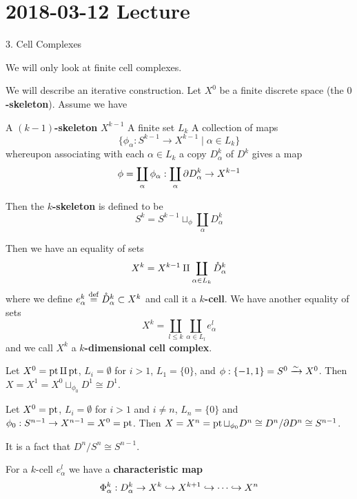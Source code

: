\section{2018-03-12 Lecture}

3. Cell Complexes

We will only look at finite cell complexes.

\begin{defn}
	\begin{enum}
		We will describe an iterative construction.
		\io Let $X^0$ be a finite discrete space (the \textbf{$0$-skeleton}).
		\io Assume we have
		\begin{itm}
			\io A \textbf{$(k-1)$-skeleton} $X^{k-1}$
			\io A finite set $L_k$
			\io A collection of maps
			\[\{\phi_\alpha: S^{k-1} \to X^{k-1} \mid \alpha \in L_k\}\]
			whereupon associating with each $\alpha \in L_k$ a copy $D_\alpha^k$ of $D^k$ gives a map
			\[\phi = \coprod_\alpha \phi_\alpha: \coprod_\alpha \partial D_\alpha^k \to X^{k-1}\]
		\end{itm}
		Then the \textbf{$k$-skeleton} is defined to be
		\[S^k = S^{k-1} \sqcup_\phi \coprod_\alpha D_\alpha^k\]
	\end{enum}
	Then we have an equality of sets
	\[X^k=X^{k-1}\amalg\coprod_{\alpha\in L_k}\mathring{D}_\alpha^k\]
	where we define $e_\alpha^k \overset{\mathrm{def}}{=} \mathring{D}_\alpha^k \subset X^k$ and call it a \textbf{$k$-cell}.
	We have another equality of sets
	\[X^k=\coprod_{l\leq k}\coprod_{\alpha\in L_l}e_\alpha^l\]
	and we call $X^k$ a \textbf{$k$-dimensional cell complex}.
\end{defn}

\begin{exam}
	Let $X^0=\operatorname{pt}\amalg\operatorname{pt}$, $L_i=\emptyset$ for $i>1$, $L_1=\{0\}$, and $\phi:\{-1,1\}=S^0 \xrightarrow{\sim}X^0$.
	Then $X=X^1=X^0\sqcup_{\phi_0}D^1\cong D^1$.
\end{exam}

\begin{exam}
	Let $X^0=\operatorname{pt}$, $L_i=\emptyset$ for $i>1$ and $i\neq n$, $L_n=\{0\}$ and $\phi_0:S^{n-1}\to X^{n-1}=X^0=\operatorname{pt}$.
Then
	$X=X^n=\operatorname{pt}\sqcup_{\phi_0}D^n\cong D^n/\partial D^n \cong S^{n-1}$.
\end{exam}

\begin{rmk}
	It is a fact that $D^n/S^n \cong S^{n-1}$.
\end{rmk}

\begin{defn}
	For a $k$-cell $e_\alpha^l$ we have a \textbf{characteristic map}
	\[\Phi_\alpha^k: D_\alpha^k \to X^k \hookrightarrow X^{k+1} \hookrightarrow \cdots \hookrightarrow X^n\]
\end{defn}

